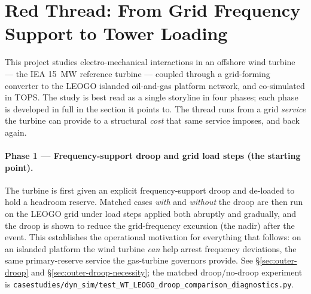 
\section{Red Thread: From Grid Frequency Support to Tower Loading}
\label{sec:narrative}

This project studies electro-mechanical interactions in an offshore wind
turbine --- the IEA \SI{15}{\mega\watt} reference turbine --- coupled through a
grid-forming converter to the LEOGO islanded oil-and-gas platform network, and
co-simulated in TOPS. The study is best read as a single storyline in four
phases; each phase is developed in full in the section it points to. The thread
runs from a grid \emph{service} the turbine can provide to a structural
\emph{cost} that same service imposes, and back again.

\paragraph{Phase 1 --- Frequency-support droop and grid load steps (the starting
point).}
The turbine is first given an explicit frequency-support droop and de-loaded to
hold a headroom reserve. Matched cases \emph{with} and \emph{without} the droop
are then run on the LEOGO grid under load steps applied both abruptly and
gradually, and the droop is shown to reduce the grid-frequency excursion (the
nadir) after the event. This establishes the operational motivation for
everything that follows: on an islanded platform the wind turbine \emph{can} help
arrest frequency deviations, the same primary-reserve service the gas-turbine
governors provide. See \S\ref{sec:outer-droop} and \S\ref{sec:outer-droop-necessity};
the matched droop/no-droop experiment is
\texttt{casestudies/dyn\_sim/test\_WT\_LEOGO\_droop\_comparison\_diagnostics.py}.

